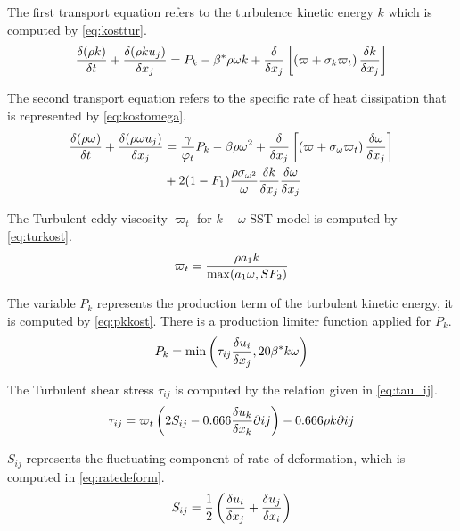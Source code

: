 \documentclass[english]{kththesis}
\begin{document}
The first transport equation refers to the turbulence kinetic energy $k$ which is computed by  \ref{eq:kosttur}.
\begin{equation}
\label{eq:kosttur}{{\delta (\rho k)} \over {\delta t}} + {{\delta (\rho k{u_j})} \over {\delta {x_j}}} = {P_k} - {\beta ^*}\rho \omega k + {\delta  \over {\delta {x_j}}}\left[ {\left( {\varpi  + {\sigma _k}{\varpi _t}} \right){{\delta k} \over {\delta {x_j}}}} \right]\end{equation}

The second transport equation refers to the specific rate of heat dissipation that is represented by \ref{eq:kostomega}.
\begin{equation}
\label{eq:kostomega}
\begin{split}
{{\delta (\rho \omega )} \over {\delta t}} + {{\delta (\rho \omega {u_j})} \over {\delta {x_j}}} & = {\gamma  \over {{\varphi _t}}}{P_k} - \beta \rho {\omega ^2}
+ {\delta  \over {\delta {x_j}}}\left[ {\left( {\varpi  + {\sigma _\omega }{\varpi _t}} \right){{\delta \omega } \over {\delta {x_j}}}} \right] \\& + 2(1 - {F_1}){{\rho {\sigma _{{\omega ^2}}}} \over \omega }{{\delta k} \over {\delta {x_j}}}{{\delta \omega } \over {\delta {x_j}}}\end{split}\end{equation}

The Turbulent eddy viscosity $\varpi _t$ for $k-\omega$ SST model is computed by \ref{eq:turkost}.
\begin{equation}\label{eq:turkost}{\varpi _t} = {{\rho {a_1}k} \over {\max ({a_1}\omega ,S{F_2})}}\end{equation}

The variable $P_k$ represents the production term of the turbulent kinetic energy, it is computed by \ref{eq:pkkost}. There is a production limiter function applied for $P_k$.
\begin{equation}\label{eq:pkkost}{P_k} = \min \left( {{\tau _{ij}}{{\delta {u_i}} \over {\delta {x_j}}},20{\beta ^*}k\omega } \right)\end{equation}

The Turbulent shear stress $\tau _{ij}$ is computed by the relation given in \ref{eq:tau_ij}.
\begin{equation}\label{eq:tau_ij}{\tau _{ij}} = {\varpi _t}\left( {2{S_{ij}} - {0.666}{{\delta {u_k}} \over {\delta {x_k}}}\partial ij} \right) - {0.666}\rho k\partial ij\end{equation}

${S_{ij}}$ represents the fluctuating component of rate of deformation, which is computed in \ref{eq:ratedeform}.
\begin{equation}\label{eq:ratedeform}{S_{ij}} = {1 \over 2}\left( {{{\delta {u_i}} \over {\delta {x_j}}} + {{\delta {u_j}} \over {\delta {x_i}}}} \right)\end{equation}
\end{document}
